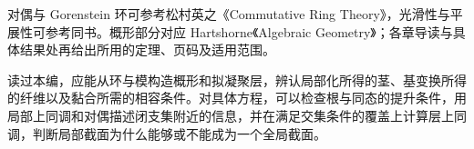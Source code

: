 \ProseParagraphBreak
对偶与 Gorenstein 环可参考松村英之《Commutative Ring Theory》\cite[\S 18]{Matsumura1989CommutativeRingTheory}，光滑性与平展性可参考同书\cite[\S 28]{Matsumura1989CommutativeRingTheory}。概形部分对应 Hartshorne《Algebraic Geometry》\cite[Chapter II, \S\S 1--5; Chapter III, \S\S 2--4]{Hartshorne1977}；各章导读与具体结果处再给出所用的定理、页码及适用范围。

\ProseParagraphBreak
读过本编，应能从环与模构造概形和拟凝聚层，辨认局部化所得的茎、基变换所得的纤维以及黏合所需的相容条件。对具体方程，可以检查根与同态的提升条件，用局部上同调和对偶描述闭支集附近的信息，并在满足交集条件的覆盖上计算层上同调，判断局部截面为什么能够或不能成为一个全局截面。




